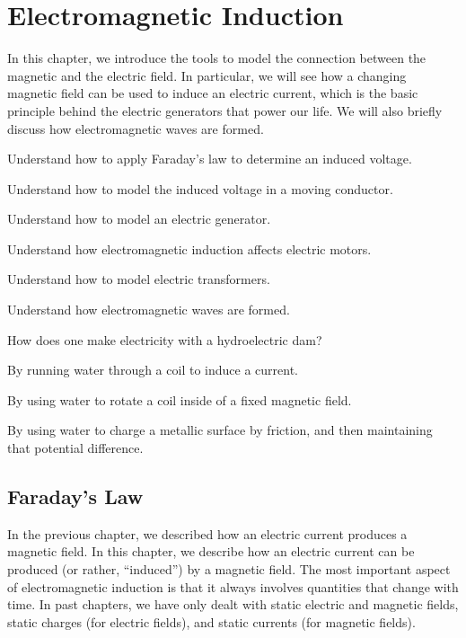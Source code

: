 \chapter{Electromagnetic Induction}
\label{chapter:induction}
In this chapter, we introduce the tools to model the connection between the magnetic and the electric field. In particular, we will see how a changing magnetic field can be used to induce an electric current, which is the basic principle behind the electric generators that power our life. We will also briefly discuss how electromagnetic waves are formed.

\begin{learningObjectives}{
 \item Understand how to apply Faraday's law to determine an induced voltage.
 \item Understand how to model the induced voltage in a moving conductor.
 \item Understand how to model an electric generator.
 \item Understand how electromagnetic induction affects electric motors.
 \item Understand how to model electric transformers.
 \item Understand how electromagnetic waves are formed.
 }
\end{learningObjectives}

\begin{opening}
\begin{MCquestion}{How does one make electricity with a hydroelectric dam?}
\item By running water through a coil to induce a current.
\item By using water to rotate a coil inside of a fixed magnetic field. \correct
\item By using water to charge a metallic surface by friction, and then maintaining that potential difference.
\end{MCquestion}
\end{opening}

\section{Faraday's Law}
In the previous chapter, we described how an electric current produces a magnetic field. In this chapter, we describe how an electric current can be produced (or rather, ``induced'') by a magnetic field. The most important aspect of electromagnetic induction is that it always involves quantities that change with time. In past chapters, we have only dealt with static electric and magnetic fields, static charges (for electric fields), and static currents (for magnetic fields). 

